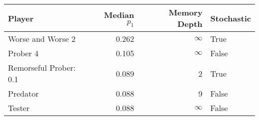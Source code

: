 \begin{tabular}{lrrl}
\toprule
                 Player &  Median $p_1$ &  Memory Depth & Stochastic \\
\midrule
      Worse and Worse 2 &         0.262 &            \(\infty\) &       True \\
               Prober 4 &         0.105 &            \(\infty\) &      False \\
 Remorseful Prober: 0.1 &         0.089 &             2 &       True \\
               Predator &         0.088 &             9 &      False \\
                 Tester &         0.088 &            \(\infty\) &      False \\
\bottomrule
\end{tabular}
